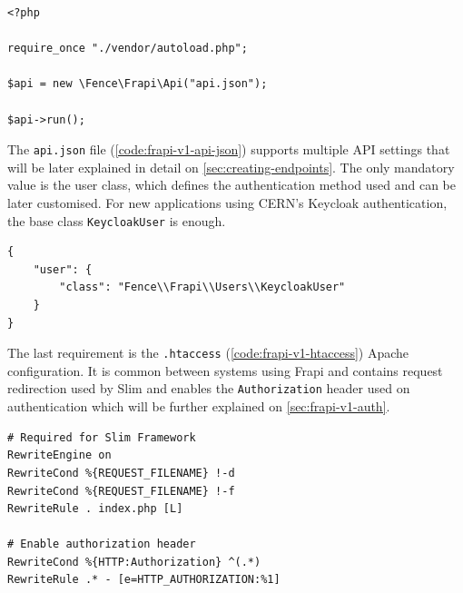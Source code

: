 \begin{listing}[H]
\begin{verbatim}
<?php
 
require_once "./vendor/autoload.php";
  
$api = new \Fence\Frapi\Api("api.json");
 
$api->run();
\end{verbatim}
\caption{Script executed when any REST API request arrives at the server.}
\label{code:frapi-v1-index-php}
\end{listing}


The \texttt{api.json} file (\autoref{code:frapi-v1-api-json}) supports multiple API settings that will be later explained in detail on \autoref{sec:creating-endpoints}. The only mandatory value is the user class, which defines the authentication method used and can be later customised. For new applications using CERN's Keycloak \cite{keycloak-website} authentication, the base class \texttt{KeycloakUser} is enough.

\begin{listing}[htbp]
\begin{verbatim}
{
    "user": {
        "class": "Fence\\Frapi\\Users\\KeycloakUser"
    }
}
\end{verbatim}
\caption{Minimal configuration for Frapi v1.}
\label{code:frapi-v1-api-json}
\end{listing}

The last requirement is the \texttt{.htaccess} (\autoref{code:frapi-v1-htaccess}) Apache configuration. It is common between systems using Frapi and contains request redirection used by Slim and enables the \texttt{Authorization} header used on authentication which will be further explained on \autoref{sec:frapi-v1-auth}.

\begin{listing}[htbp]
\begin{verbatim}
# Required for Slim Framework
RewriteEngine on
RewriteCond %{REQUEST_FILENAME} !-d
RewriteCond %{REQUEST_FILENAME} !-f
RewriteRule . index.php [L]
 
# Enable authorization header
RewriteCond %{HTTP:Authorization} ^(.*)
RewriteRule .* - [e=HTTP_AUTHORIZATION:%1]
\end{verbatim}
\caption{Apache configuration for redirecting request to the API entry point.}
\label{code:frapi-v1-htaccess}
\end{listing}

